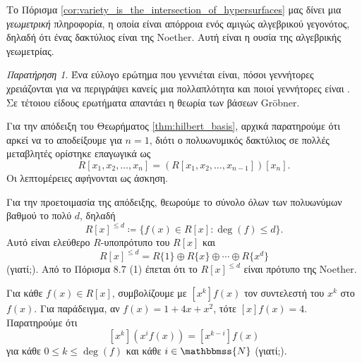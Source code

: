 \documentclass[12pt,a4paper,reqno]{amsart}
\theoremstyle{definition}
\theoremstyle{remark}
\newtheorem*{remark}{Παρατήρηση}
\numberwithin{theorem}{section}
\numberwithin{exercise}{section}
\numberwithin{equation}{section}
\newcommand{\NN}{\mathbbmss{N}}
\begin{document}
Το Πόρισμα \ref{cor:variety_is_the_intersection_of_hypersurfaces} μας δίνει μια \emph{γεωμετρική} πληροφορία, η οποία είναι απόρροια ενός αμιγώς αλγεβρικού γεγονότος, δηλαδή ότι ένας δακτύλιος είναι της Noether. Αυτή είναι η ουσία της αλγεβρικής γεωμετρίας.

\begin{remark}
    Ένα εύλογο ερώτημα που γεννιέται είναι, πόσοι γεννήτορες χρειάζονται για να περιγράψει κανείς μια πολλαπλότητα και ποιοί γεννήτορες είναι . Σε τέτοιου είδους ερωτήματα απαντάει η θεωρία των βάσεων Gr\"obner. 
\end{remark}

Για την απόδειξη του Θεωρήματος \ref{thm:hilbert_basis}, αρχικά παρατηρούμε ότι αρκεί να το αποδείξουμε για $n=1$, διότι ο πολυωνυμικός δακτύλιος σε πολλές μεταβλητές ορίστηκε επαγωγικά ως 
\[
R[x_1, x_2, \dots, x_n] = \left(R[x_1, x_2, \dots, x_{n-1}]\right)[x_n].
\]
Οι λεπτομέρειες αφήνονται ως άσκηση.

Για την προετοιμασία της απόδειξης, θεωρούμε το σύνολο όλων των πολυωνύμων βαθμού το πολύ $d$, δηλαδή
\[
R[x]^{\le d} \coloneqq \{f(x) \in R[x] : \deg(f) \le d\}.
\]
Αυτό είναι ελεύθερο $R$-υποπρότυπο του $R[x]$ και
\[
R[x]^{\le d} = R\{1\} \oplus R\{x\} \oplus \cdots \oplus R\{x^d\}
\]
(γιατί;). Από το Πόρισμα 8.7 (1) έπεται ότι το $R[x]^{\le d}$ είναι πρότυπο της Noether.

Για κάθε $f(x) \in R[x]$, συμβολίζουμε με $[x^k]f(x)$ τον συντελεστή του $x^k$ στο $f(x)$. Για παράδειγμα, αν $f(x) = 1 + 4x + x^2$, τότε $[x]f(x) = 4$. Παρατηρούμε ότι 
\begin{equation}
    \label{eq:coefficient}
    [x^k]\left(
        x^if(x)
    \right) = [x^{k-i}]f(x)
\end{equation}
για κάθε $0 \le k \le \deg(f)$ και κάθε $i \in \NN$ (γιατί;).
\end{document}
